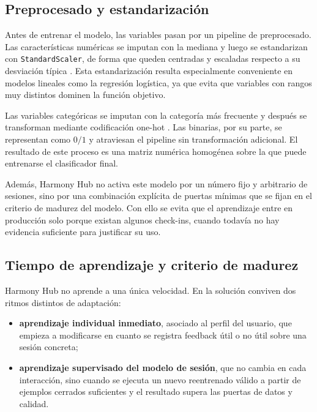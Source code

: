 \subsection{Preprocesado y estandarización}
\label{subsec:estandarizacion_ml}

Antes de entrenar el modelo, las variables pasan por un pipeline de
preprocesado. Las características numéricas se imputan con la mediana y luego
se estandarizan con \texttt{StandardScaler}, de forma que queden centradas y
escaladas respecto a su desviación típica \cite{sklearn_standard_scaler}. Esta
estandarización resulta especialmente conveniente en modelos lineales como la
regresión logística, ya que evita que variables con rangos muy distintos
dominen la función objetivo.

Las variables categóricas se imputan con la categoría más frecuente y después
se transforman mediante codificación one-hot
\cite{sklearn_onehot_encoder}. Las binarias, por su parte, se representan como
\(0/1\) y atraviesan el pipeline sin transformación adicional. El resultado de
este proceso es una matriz numérica homogénea sobre la que puede entrenarse el
clasificador final.

Además, Harmony Hub no activa este modelo por un número fijo y arbitrario de
sesiones, sino por una combinación explícita de puertas mínimas que se fijan en
el criterio de madurez del modelo. Con ello se evita que el aprendizaje entre
en producción solo porque existan algunos check-ins, cuando todavía no hay
evidencia suficiente para justificar su uso.

\subsection{Tiempo de aprendizaje y criterio de madurez}
\label{subsec:tiempo_aprendizaje_modelo}

Harmony Hub no aprende a una única velocidad. En la solución conviven dos
ritmos distintos de adaptación:

\begin{itemize}
    \item \textbf{aprendizaje individual inmediato}, asociado al perfil del
    usuario, que empieza a modificarse en cuanto se registra feedback útil o no
    útil sobre una sesión concreta;
    \item \textbf{aprendizaje supervisado del modelo de sesión}, que no cambia
    en cada interacción, sino cuando se ejecuta un nuevo reentrenado válido a
    partir de ejemplos cerrados suficientes y el resultado supera las puertas
    de datos y calidad.
\end{itemize}


